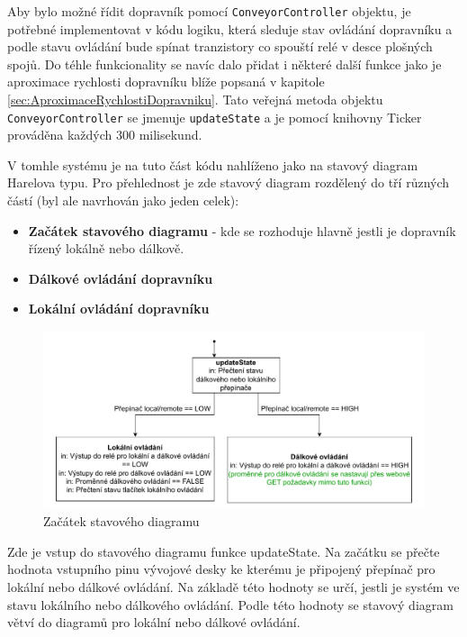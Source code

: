 Aby bylo možné řídit dopravník pomocí \texttt{ConveyorController} objektu, je potřebné implementovat v kódu logiku, která sleduje stav ovládání dopravníku a podle stavu ovládání bude spínat tranzistory co spouští relé v desce plošných spojů. Do téhle funkcionality se navíc dalo přidat i některé další funkce jako je aproximace rychlosti dopravníku blíže popsaná v kapitole \ref{sec:AproximaceRychlostiDopravniku}. Tato veřejná metoda objektu \texttt{ConveyorController} se jmenuje \texttt{updateState} a je pomocí knihovny Ticker prováděna každých 300 milisekund.

V tomhle systému je na tuto část kódu nahlíženo jako na stavový diagram Harelova typu. Pro přehlednost je zde stavový diagram rozdělený do tří různých částí (byl ale navrhován jako jeden celek):
\begin{itemize}
	\item \textbf{Začátek stavového diagramu} - kde se rozhoduje hlavně jestli je dopravník řízený lokálně nebo dálkově.
	\item \textbf{Dálkové ovládání dopravníku}
	\item \textbf{Lokální ovládání dopravníku}
\end{itemize}

\begin{figure}[H]
	\centering
	\includegraphics[width=1\linewidth]{images/StateFlow_Firmwaru_top.drawio.pdf}
	\caption{Začátek stavového diagramu}
	\label{fig:StateFlow_Firmwaru_top}
\end{figure}

Zde je vstup do stavového diagramu funkce updateState. Na začátku se přečte hodnota vstupního pinu vývojové desky ke kterému je připojený přepínač pro lokální nebo dálkové ovládání. Na základě této hodnoty se určí, jestli je systém ve stavu lokálního nebo dálkového ovládání. Podle této hodnoty se stavový diagram větví do diagramů pro lokální nebo dálkové ovládání.

